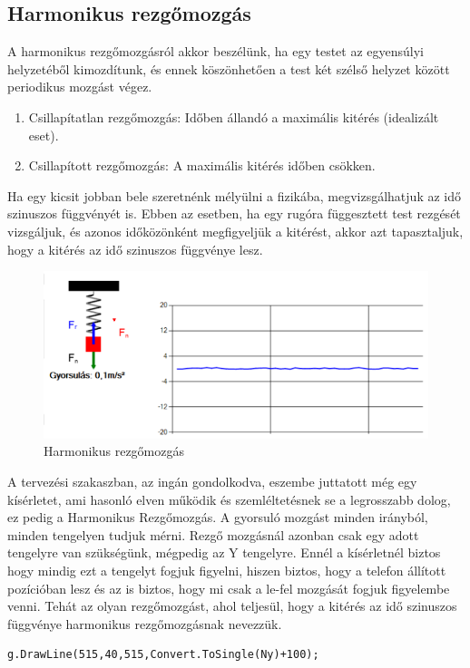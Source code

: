 \documentclass{thesis-ekf}
\theoremstyle{definition}
\theoremstyle{remark}
\begin{document}
\subsection{Harmonikus rezgőmozgás}
A harmonikus rezgőmozgásról akkor beszélünk, ha egy testet az egyensúlyi helyzetéből kimozdítunk, és ennek köszönhetően a test két szélső helyzet között periodikus mozgást végez.
\begin{enumerate}
	\item Csillapítatlan rezgőmozgás: Időben állandó a maximális kitérés (idealizált eset).
	\item Csillapított rezgőmozgás: A maximális kitérés időben csökken.
\end{enumerate}
\par Ha egy kicsit jobban bele szeretnénk mélyülni a fizikába, megvizsgálhatjuk az idő szinuszos függvényét is. Ebben az esetben, ha egy rugóra függesztett test rezgését vizsgáljuk, és azonos időközönként megfigyeljük a kitérést, akkor azt tapasztaljuk, hogy a kitérés az idő szinuszos függvénye lesz.
\begin{figure}[!h]
	\centering
	\includegraphics[width=15cm]{harmonikus}
	\caption{Harmonikus rezgőmozgás}\label{harmonikus}
\end{figure}
\par A tervezési szakaszban, az ingán gondolkodva, eszembe juttatott még egy kísérletet, ami hasonló elven működik és szemléltetésnek se a legrosszabb dolog, ez pedig a Harmonikus Rezgőmozgás. A gyorsuló mozgást minden irányból, minden tengelyen tudjuk mérni. Rezgő mozgásnál azonban csak egy adott tengelyre van szükségünk, mégpedig az Y tengelyre. Ennél a kísérletnél biztos hogy mindig ezt a tengelyt fogjuk figyelni, hiszen biztos, hogy a telefon állított pozícióban lesz és az is biztos, hogy mi csak a le-fel mozgását fogjuk figyelembe venni.  Tehát az olyan rezgőmozgást, ahol teljesül, hogy a kitérés az idő szinuszos függvénye harmonikus rezgőmozgásnak nevezzük.
 \begin{lstlisting}
g.DrawLine(515,40,515,Convert.ToSingle(Ny)+100);
 \end{lstlisting}
\end{document}
